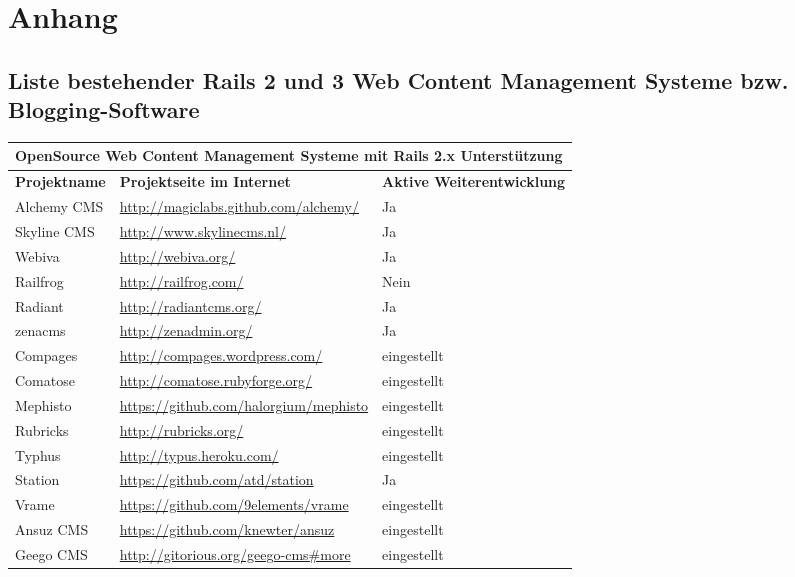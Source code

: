 \chapter{Anhang}
\section{Liste bestehender Rails 2 und 3 Web Content Management Systeme bzw. Blogging-Software}

\begin{table}[!ht]
\center
\begin{tabular}[]{|p{3cm}|p{8cm}|p{4cm}|}
\hline
\multicolumn{3}{|p{15cm}|}{\textbf{OpenSource Web Content Management Systeme mit Rails 2.x Unterstützung}}\\
\hline
\textbf{Projektname}&\textbf{Projektseite im Internet}&\textbf{Aktive Weiterentwicklung}\\
\hline
Alchemy CMS & \href{http://magiclabs.github.com/alchemy/}{http://magiclabs.github.com/alchemy/} & Ja \\
\hline
Skyline CMS & \href{http://www.skylinecms.nl/}{http://www.skylinecms.nl/} & Ja \\
\hline
Webiva & \href{http://webiva.org/}{http://webiva.org/} & Ja \\
\hline
Railfrog & \href{http://railfrog.com/}{http://railfrog.com/} & Nein \\
\hline
Radiant & \href{http://radiantcms.org/}{http://radiantcms.org/} & Ja \\
\hline
zenacms & \href{http://zenadmin.org/}{http://zenadmin.org/} & Ja \\
\hline
Compages & \href{http://compages.wordpress.com/}{http://compages.wordpress.com/} & eingestellt\\
\hline
Comatose & \href{http://comatose.rubyforge.org/}{http://comatose.rubyforge.org/} & eingestellt\\
\hline
Mephisto & \href{https://github.com/halorgium/mephisto}{https://github.com/halorgium/mephisto} & eingestellt\\
\hline
Rubricks & \href{http://rubricks.org/}{http://rubricks.org/} & eingestellt\\
\hline
Typhus & \href{http://typus.heroku.com/}{http://typus.heroku.com/} & eingestellt\\
\hline
Station & \href{https://github.com/atd/station}{https://github.com/atd/station} & Ja\\
\hline
Vrame & \href{https://github.com/9elements/vrame}{https://github.com/9elements/vrame} & eingestellt\\
\hline
Ansuz CMS & \href{https://github.com/knewter/ansuz}{https://github.com/knewter/ansuz} & eingestellt\\
\hline
Geego CMS & \href{http://gitorious.org/geego-cms\#more}{http://gitorious.org/geego-cms\#more} & eingestellt\\
\hline


\end{tabular}
\end{table}

